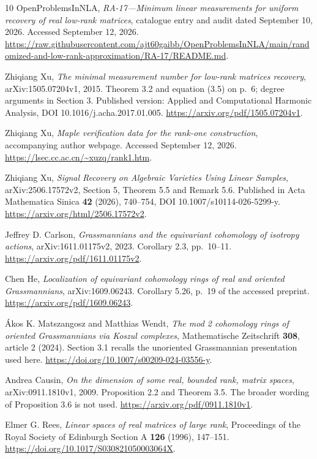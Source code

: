 \documentclass[11pt]{article}
\theoremstyle{definition}
\begin{document}
\clearpage
\begin{thebibliography}{10}
OpenProblemsInNLA, \emph{RA-17---Minimum linear measurements for uniform recovery of real low-rank matrices}, catalogue entry and audit dated September 10, 2026. Accessed September 12, 2026.
\url{https://raw.githubusercontent.com/ajt60gaibb/OpenProblemsInNLA/main/randomized-and-low-rank-approximation/RA-17/README.md}.

Zhiqiang Xu, \emph{The minimal measurement number for low-rank matrices recovery}, arXiv:1505.07204v1, 2015. Theorem 3.2 and equation (3.5) on p.~6; degree arguments in Section 3. Published version: Applied and Computational Harmonic Analysis, DOI 10.1016/j.acha.2017.01.005.
\url{https://arxiv.org/pdf/1505.07204v1}.

Zhiqiang Xu, \emph{Maple verification data for the rank-one construction}, accompanying author webpage. Accessed September 12, 2026.
\url{https://lsec.cc.ac.cn/~xuzq/rank1.htm}.

Zhiqiang Xu, \emph{Signal Recovery on Algebraic Varieties Using Linear Samples}, arXiv:2506.17572v2, Section 5, Theorem 5.5 and Remark 5.6. Published in Acta Mathematica Sinica \textbf{42} (2026), 740--754, DOI 10.1007/s10114-026-5299-y.
\url{https://arxiv.org/html/2506.17572v2}.

Jeffrey D. Carlson, \emph{Grassmannians and the equivariant cohomology of isotropy actions}, arXiv:1611.01175v2, 2023. Corollary 2.3, pp.~10--11.
\url{https://arxiv.org/pdf/1611.01175v2}.

Chen He, \emph{Localization of equivariant cohomology rings of real and oriented Grassmannians}, arXiv:1609.06243. Corollary 5.26, p.~19 of the accessed preprint.
\url{https://arxiv.org/pdf/1609.06243}.

\'Akos K. Matszangosz and Matthias Wendt, \emph{The mod 2 cohomology rings of oriented Grassmannians via Koszul complexes}, Mathematische Zeitschrift \textbf{308}, article 2 (2024). Section 3.1 recalls the unoriented Grassmannian presentation used here.
\url{https://doi.org/10.1007/s00209-024-03556-y}.

Andrea Causin, \emph{On the dimension of some real, bounded rank, matrix spaces}, arXiv:0911.1810v1, 2009. Proposition 2.2 and Theorem 3.5. The broader wording of Proposition 3.6 is not used.
\url{https://arxiv.org/pdf/0911.1810v1}.

Elmer G. Rees, \emph{Linear spaces of real matrices of large rank}, Proceedings of the Royal Society of Edinburgh Section A \textbf{126} (1996), 147--151.
\url{https://doi.org/10.1017/S030821050003064X}.
\end{thebibliography}
\end{document}
